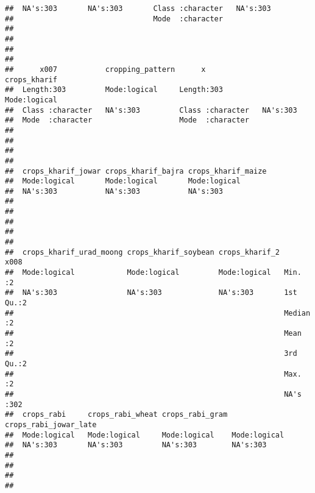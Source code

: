 \documentclass[
]{article}
\begin{document}
\begin{verbatim}
##  NA's:303       NA's:303       Class :character   NA's:303      
##                                Mode  :character                 
##                                                                 
##                                                                 
##                                                                 
##                                                                 
##      x007           cropping_pattern      x             crops_kharif  
##  Length:303         Mode:logical     Length:303         Mode:logical  
##  Class :character   NA's:303         Class :character   NA's:303      
##  Mode  :character                    Mode  :character                 
##                                                                       
##                                                                       
##                                                                       
##                                                                       
##  crops_kharif_jowar crops_kharif_bajra crops_kharif_maize
##  Mode:logical       Mode:logical       Mode:logical      
##  NA's:303           NA's:303           NA's:303          
##                                                          
##                                                          
##                                                          
##                                                          
##                                                          
##  crops_kharif_urad_moong crops_kharif_soybean crops_kharif_2      x008    
##  Mode:logical            Mode:logical         Mode:logical   Min.   :2    
##  NA's:303                NA's:303             NA's:303       1st Qu.:2    
##                                                              Median :2    
##                                                              Mean   :2    
##                                                              3rd Qu.:2    
##                                                              Max.   :2    
##                                                              NA's   :302  
##  crops_rabi     crops_rabi_wheat crops_rabi_gram crops_rabi_jowar_late
##  Mode:logical   Mode:logical     Mode:logical    Mode:logical         
##  NA's:303       NA's:303         NA's:303        NA's:303             
##                                                                       
##                                                                       
##                                                                       
##                                                                       

\end{verbatim}
\end{document}
